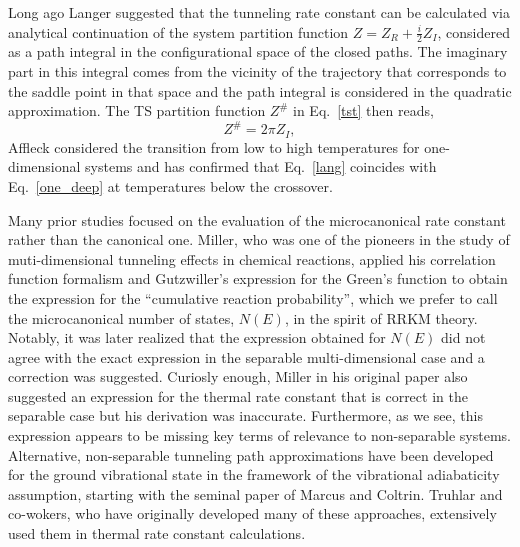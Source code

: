 \documentclass[journal=jpcafh,manuscript=article]{achemso}
\begin{document}
Long ago Langer\cite{langer67} suggested that the tunneling rate
constant can be calculated via analytical continuation of the system
partition function $Z= Z_R +\frac{i}{2}Z_{I}$, considered as a path
integral in the configurational space of the closed paths. The
imaginary part in this integral comes from the vicinity of the
trajectory that corresponds to the saddle point in that space and the
path integral is considered in the quadratic approximation. The TS
partition function $Z^\#$ in Eq.~\ref{tst} then reads,
\begin{equation}
  \label{lang}
  Z^\# = 2\pi Z_{I},
\end{equation}
Affleck\cite{affleck81} considered the transition from low to high
temperatures for one-dimensional systems and has confirmed that
Eq.~\ref{lang} coincides with Eq.~\ref{one_deep} at temperatures below
the crossover.

Many prior studies focused on the evaluation of the microcanonical
rate constant rather than the canonical one.  Miller\cite{miller75},
who was one of the pioneers in the study of muti-dimensional tunneling
effects in chemical reactions, applied his correlation function
formalism\cite{miller74} and Gutzwiller's expression for the Green's
function\cite{gutzwiller71} to obtain the expression for the
``cumulative reaction probability'', which we prefer to call the
microcanonical number of states, $N(E)$, in the spirit of RRKM
theory.\cite{marcus52} Notably, it was later realized that the
expression obtained for $N(E)$ did not agree with the exact expression
in the separable multi-dimensional case and a correction was
suggested.\cite{chapman75} Curiosly enough, Miller in his original
paper\cite{miller75} also suggested an expression for the thermal rate
constant that is correct in the separable case but his derivation was
inaccurate.\cite{comment1} Furthermore, as we see, this expression
appears to be missing key terms of relevance to non-separable
systems. Alternative, non-separable tunneling path approximations have
been developed for the ground vibrational state in the framework of
the vibrational adiabaticity assumption, starting with the seminal
paper of Marcus and Coltrin.\cite{marcus77} Truhlar and co-wokers, who
have originally developed many of these
approaches,\cite{scodje81,scodje82} extensively used them in thermal
rate constant
calculations.\cite{liu93,liu93a,ramos05,paneda10,paneda11,gao18}
\end{document}
